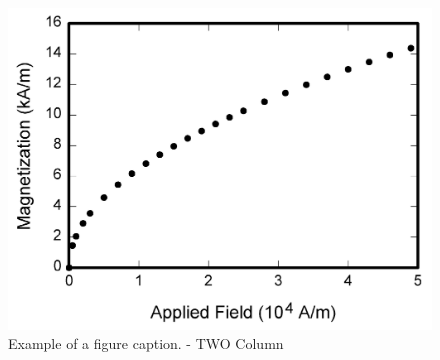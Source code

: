 \documentclass[conference]{IEEEtran}
\begin{document}
\begin{figure}[htbp]
    \includegraphics[width=7.16in]{Photos/fig1.png}
    \caption{Example of a figure caption. - TWO Column}
    \label{fig:name2}
\end{figure}




\end{document}
